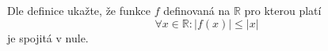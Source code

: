 Dle definice ukažte, že funkce $f$ definovaná na $\mathbb{R}$ pro kterou platí
$$\forall x \in \mathbb{R} \colon |f(x)| \leq |x|$$
je spojitá v nule.

